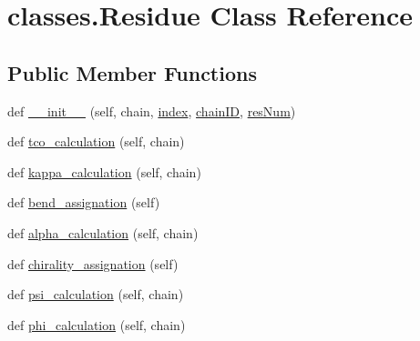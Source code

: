 \hypertarget{classclasses_1_1Residue}{}\section{classes.\+Residue Class Reference}
\label{classclasses_1_1Residue}
\subsection*{Public Member Functions}
\begin{DoxyCompactItemize}
\item 
def \hyperlink{classclasses_1_1Residue_af632a3e7f910bb899516c7496ff68f74}{\+\_\+\+\_\+init\+\_\+\+\_\+} (self, chain, \hyperlink{classclasses_1_1Residue_ab030195b5da491ab560f64c3eb1808c5}{index}, \hyperlink{classclasses_1_1Residue_a43f7aa75c8fbb7e428e14f0f44ae40f8}{chain\+ID}, \hyperlink{classclasses_1_1Residue_aaf2c88576b265dfb10716860fb8e405b}{res\+Num})
\item 
def \hyperlink{classclasses_1_1Residue_afa173e3aad55fd4df258ddd98fdc90d3}{tco\+\_\+calculation} (self, chain)
\item 
def \hyperlink{classclasses_1_1Residue_ab4977c936312bc08a4e610eafb4036e6}{kappa\+\_\+calculation} (self, chain)
\item 
def \hyperlink{classclasses_1_1Residue_af3fc218f944917d3a829fab3399622d3}{bend\+\_\+assignation} (self)
\item 
def \hyperlink{classclasses_1_1Residue_acd9bbebf711e2680e3adf4a3b0421645}{alpha\+\_\+calculation} (self, chain)
\item 
def \hyperlink{classclasses_1_1Residue_ae037ce1cf5096a0f9a866e48a3de033b}{chirality\+\_\+assignation} (self)
\item 
def \hyperlink{classclasses_1_1Residue_a4f87292466229c321c9c7b3dc0d238ea}{psi\+\_\+calculation} (self, chain)
\item 
def \hyperlink{classclasses_1_1Residue_ae7879bd7944ba1afc56edcb94e5ff5a4}{phi\+\_\+calculation} (self, chain)
\end{DoxyCompactItemize}
